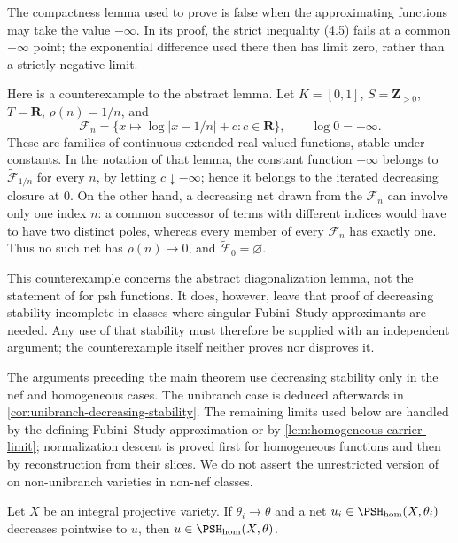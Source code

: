 \documentclass[11pt,a4paper]{article}
\newcommand{\PSHhom}{\PSH_{\mathrm{hom}}}          %
\begin{document}
\begin{remark}\label{rem:BJ-decreasing-limits}
The compactness lemma \cite[Lemma~4.6]{BJ22} used to prove \cite[Theorem~4.5]{BJ22} is false when the approximating functions may take the value $-\infty$. In its proof, the strict inequality (4.5) fails at a common $-\infty$ point; the exponential difference used there then has limit zero, rather than a strictly negative limit.

Here is a counterexample to the abstract lemma. Let $K=[0,1]$, $S=\mathbf Z_{>0}$, $T=\mathbf R$, $\rho(n)=1/n$, and
\[
 \mathcal F_n=\{x\longmapsto\log|x-1/n|+c:c\in\mathbf R\},
 \qquad\log0=-\infty.
\]
These are families of continuous extended-real-valued functions, stable under constants. In the notation of that lemma, the constant function $-\infty$ belongs to $\widetilde{\mathcal F}_{1/n}$ for every $n$, by letting $c\downarrow-\infty$; hence it belongs to the iterated decreasing closure at $0$. On the other hand, a decreasing net drawn from the $\mathcal F_n$ can involve only one index $n$: a common successor of terms with different indices would have to have two distinct poles, whereas every member of every $\mathcal F_n$ has exactly one. Thus no such net has $\rho(n)\to0$, and $\widetilde{\mathcal F}_0=\varnothing$.

This counterexample concerns the abstract diagonalization lemma, not the statement of \cite[Theorem~4.5]{BJ22} for psh functions. It does, however, leave that proof of decreasing stability incomplete in classes where singular Fubini--Study approximants are needed. Any use of that stability must therefore be supplied with an independent argument; the counterexample itself neither proves nor disproves it.

The arguments preceding the main theorem use decreasing stability only in the nef and homogeneous cases. The unibranch case is deduced afterwards in \cref{cor:unibranch-decreasing-stability}. The remaining limits used below are handled by the defining Fubini--Study approximation or by \cref{lem:homogeneous-carrier-limit}; normalization descent is proved first for homogeneous functions and then by reconstruction from their slices. We do not assert the unrestricted version of \cite[Theorem~4.5]{BJ22} on non-unibranch varieties in non-nef classes.
\end{remark}

\begin{lemma}\label{lem:homogeneous-decreasing-stability}
Let $X$ be an integral projective variety. If $\theta_i\to\theta$ and a net $u_i\in\PSHhom(X,\theta_i)$ decreases pointwise to $u$, then $u\in\PSHhom(X,\theta)$.
\end{lemma}
\end{document}
